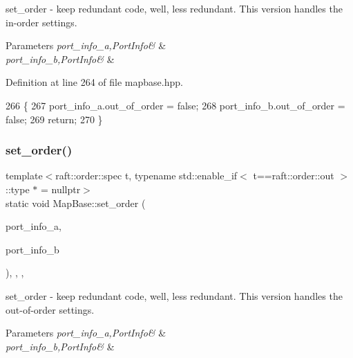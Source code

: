 set\+\_\+order -\/ keep redundant code, well, less redundant. This version handles the in-\/order settings. 
\begin{DoxyParams}{Parameters}
{\em port\+\_\+info\+\_\+a,Port\+Info\&} & \\
\hline
{\em port\+\_\+info\+\_\+b,Port\+Info\&} & \\
\hline
\end{DoxyParams}


Definition at line 264 of file mapbase.\+hpp.


\begin{DoxyCode}
266    \{
267         port\_info\_a.out\_of\_order = \textcolor{keyword}{false}; 
268         port\_info\_b.out\_of\_order = \textcolor{keyword}{false};
269         \textcolor{keywordflow}{return};           
270    \}
\end{DoxyCode}
\hypertarget{class_map_base_ab2bdd75e5f2f7a84ec7146625f85dbde}{}\label{class_map_base_ab2bdd75e5f2f7a84ec7146625f85dbde} 
\subsubsection{\texorpdfstring{set\+\_\+order()}{set\_order()}\hspace{0.1cm}{\footnotesize\ttfamily [2/2]}}
{\footnotesize\ttfamily template$<$raft\+::order\+::spec t, typename std\+::enable\+\_\+if$<$ t==raft\+::order\+::out $>$\+::type $\ast$  = nullptr$>$ \\
static void Map\+Base\+::set\+\_\+order (\begin{DoxyParamCaption}\item[{\hyperlink{struct_port_info}{Port\+Info} \&}]{port\+\_\+info\+\_\+a,  }\item[{\hyperlink{struct_port_info}{Port\+Info} \&}]{port\+\_\+info\+\_\+b }\end{DoxyParamCaption})\hspace{0.3cm}{\ttfamily [inline]}, {\ttfamily [static]}, {\ttfamily [protected]}, {\ttfamily [noexcept]}}

set\+\_\+order -\/ keep redundant code, well, less redundant. This version handles the out-\/of-\/order settings. 
\begin{DoxyParams}{Parameters}
{\em port\+\_\+info\+\_\+a,Port\+Info\&} & \\
\hline
{\em port\+\_\+info\+\_\+b,Port\+Info\&} & \\
\hline
\end{DoxyParams}


